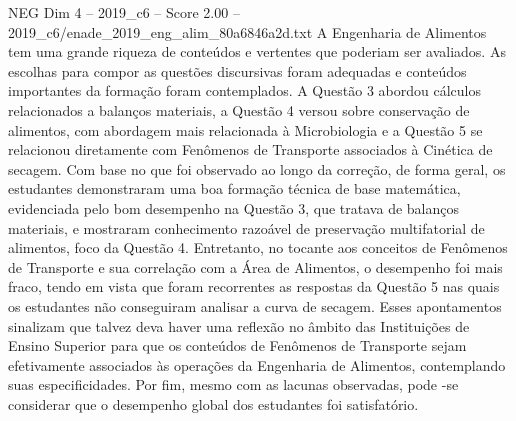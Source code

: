 \begin{textsample}{NEG Dim 4 – 2019\_c6 – Score 2.00 – 2019\_c6/enade\_2019\_eng\_alim\_80a6846a2d.txt}
A Engenharia de Alimentos tem uma grande riqueza de conteúdos e vertentes que poderiam ser avaliados.
As escolhas para compor as questões discursivas foram adequadas e conteúdos importantes da formação foram contemplados.
A Questão 3 abordou cálculos relacionados a balanços materiais, a Questão 4 versou sobre conservação de alimentos, com abordagem mais relacionada à Microbiologia e a Questão 5 se relacionou diretamente com Fenômenos de Transporte associados à Cinética de secagem.
Com base no que foi observado ao longo da correção, de forma geral, os estudantes demonstraram uma boa formação técnica de base matemática, evidenciada pelo bom desempenho na Questão 3, que tratava de balanços materiais, e mostraram conhecimento razoável de preservação multifatorial de alimentos, foco da Questão 4.
Entretanto, no tocante aos conceitos de Fenômenos de Transporte e sua correlação com a Área de Alimentos, o desempenho foi mais fraco, tendo em vista que foram recorrentes as respostas da Questão 5 nas quais os estudantes não conseguiram analisar a curva de secagem.
Esses apontamentos sinalizam que talvez deva haver uma reflexão no âmbito das Instituições de Ensino Superior para que os conteúdos de Fenômenos de Transporte sejam efetivamente associados às operações da Engenharia de Alimentos, contemplando suas especificidades.
Por fim, mesmo com as lacunas observadas, pode -se considerar que o desempenho global dos estudantes foi satisfatório.

\end{textsample}

